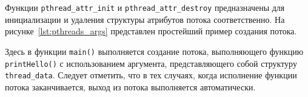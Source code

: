Функции \texttt{pthread\_attr\_init} и \texttt{pthread\_attr\_destroy}
предназначены для инициализации и удаления структуры атрибутов
потока соответственно.
На рисунке~\ref{lst:pthreads_args} представлен простейший пример создания потока.


Здесь в функции \texttt{main()} выполняется создание потока,
выполняющего функцию \texttt{printHello()} с использованием
аргумента, представляющего собой структуру \texttt{thread\_data}.
Следует отметить, что в тех случаях, когда исполнение функции
потока заканчивается, выход из потока выполняется автоматически.



